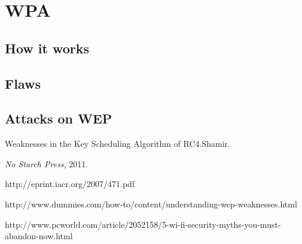 \documentclass[a4paper,12pt,pagesize,headsepline,bibtotoc,titlepage]{scrartcl}
\begin{document}
\newpage
\section{WPA}
\subsection{How it works}
\subsection{Flaws}
\subsection{Attacks on WEP}
\newpage





\newpage


\begin{thebibliography}{1}

 Weaknesses in the Key Scheduling Algorithm of RC4.Shamir.

\emph{No Starch Press},
 2011.

http://eprint.iacr.org/2007/471.pdf

http://www.dummies.com/how-to/content/understanding-wep-weaknesses.html

http://www.pcworld.com/article/2052158/5-wi-fi-security-myths-you-must-abandon-now.html

\end{thebibliography}
\end{document}
